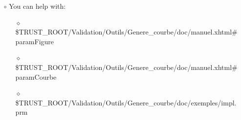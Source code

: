 \documentclass[10pt]{beamer}
\begin{document}
\begin{frame}
\begin{block}{}
\begin{itemize}
\begin{itemize}
{{    \hspace{0.6cm} \textbf{\}}  \\
    \hspace{0.6cm} \textbf{...}  \\
    \hspace{.3cm} \textbf{\}}  \\
    }}
    \item [$\circ$] You can help with:
        \begin{itemize}
        \item [$\diamond$] {\scriptsize{\$TRUST\_ROOT/Validation/Outils/Genere\_courbe/doc/manuel.xhtml\#paramFigure}}
        \item [$\diamond$] {\scriptsize{\$TRUST\_ROOT/Validation/Outils/Genere\_courbe/doc/manuel.xhtml\#paramCourbe}}
        \item [$\diamond$] {\scriptsize{\$TRUST\_ROOT/Validation/Outils/Genere\_courbe/doc/exemples/impl.prm}}
        \end{itemize}
    \end{itemize}
\end{itemize}

\end{block}
\end{frame}
\end{document}
